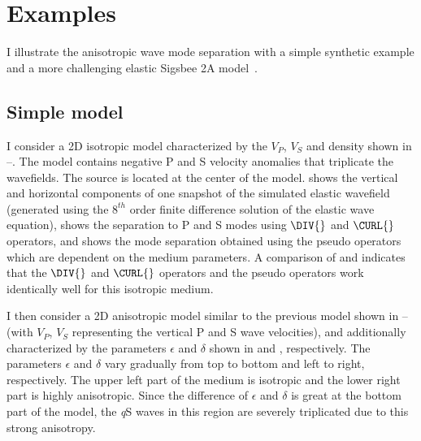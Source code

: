 




\section{Examples}

I illustrate the anisotropic wave mode separation with a simple
synthetic example and a more challenging elastic Sigsbee 2A
model~\cite[]{SEG-2002-21222125}.
\subsection{Simple model}
I consider a 2D isotropic model characterized by the $V_{P}$, $V_{S}$
and density shown in --.
The model contains negative P and S velocity anomalies that triplicate
the wavefields.  The source is located at the center of the
model.   shows the vertical and horizontal
components of one snapshot of the simulated elastic wavefield
{(generated using the $8^{th}$ order finite difference solution of the
elastic wave equation)},  shows the separation
to P and S modes using $\DIV{}$ and $\CURL{}$ operators,
and  shows the mode separation obtained using
the pseudo operators which are dependent on the medium parameters.  A
comparison of
 and  indicates 
that the $\DIV{}$ and $\CURL{}$ operators and the pseudo operators
work identically well for this isotropic medium.

I then consider a 2D anisotropic model similar to the previous model
shown in -- (with $V_{P}$,
$V_{S}$ representing the vertical P and S wave velocities), and
additionally characterized by the parameters $\epsilon$ and $\delta$
shown in  and ,
respectively.  The parameters $\epsilon$ and $\delta$ vary gradually
from top to bottom and left to right, respectively. The upper left
part of the medium is isotropic and the lower right part is highly
anisotropic. Since the difference of $\epsilon$ and $\delta$ is great
at the bottom part of the model, the {\it q}S waves in this region are
severely triplicated due to this strong anisotropy.

